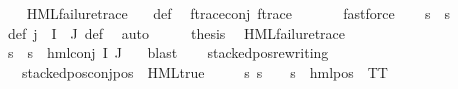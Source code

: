 \begin{isabellebody}
\ \ \isamarkupfalse%
\ {\isachardoublequoteopen}HML{\isacharunderscore}{\kern0pt}failure{\isacharunderscore}{\kern0pt}trace\ {\isasympsi}{\isachardoublequoteclose}\ \isamarkupfalse%
\ {\isasympsi}{\isacharunderscore}{\kern0pt}def\ \isamarkupfalse%
\ f{\isacharunderscore}{\kern0pt}trace{\isacharunderscore}{\kern0pt}conj\ f{\isacharunderscore}{\kern0pt}trace\ \isanewline
\ \ \ \ \isamarkupfalse%
\ fastforce\isanewline
\ \ \isamarkupfalse%
\ {\isachardoublequoteopen}{\isasymforall}s{\isachardot}{\kern0pt}\ {\isasymnot}\ s\ {\isasymTurnstile}\ {\isasympsi}{\isachardoublequoteclose}\ \isanewline
\ \ \ \ \isamarkupfalse%
\ {\isasymPsi}{\isacharunderscore}{\kern0pt}def\ {\isacartoucheopen}j\ {\isasymin}\ I\ {\isasyminter}\ J{\isacartoucheclose}\ {\isasympsi}{\isacharunderscore}{\kern0pt}def\ \isamarkupfalse%
\ auto\isanewline
\ \ \isamarkupfalse%
\ \isamarkupfalse%
\ {\isacharquery}{\kern0pt}thesis\ \isamarkupfalse%
\ {\isacartoucheopen}HML{\isacharunderscore}{\kern0pt}failure{\isacharunderscore}{\kern0pt}trace\ {\isasympsi}{\isacartoucheclose}\ \isanewline
\ \ \ \ \isamarkupfalse%
\ {\isacartoucheopen}{\isasymforall}s{\isachardot}{\kern0pt}\ {\isasymnot}\ s\ {\isasymTurnstile}\ hml{\isacharunderscore}{\kern0pt}conj\ I\ J\ {\isasymPhi}{\isacartoucheclose}\ \isamarkupfalse%
\ blast\isanewline
\ \ \isamarkupfalse%
\isanewline
{}\isamarkupfalse%
%
\endisatagproof
{\isafoldproof}%
%
\isadelimproof
\isanewline
%
\endisadelimproof
\isanewline
{}\isamarkupfalse%
\ stacked{\isacharunderscore}{\kern0pt}pos{\isacharunderscore}{\kern0pt}rewriting{\isacharcolon}{\kern0pt}\isanewline
\ \ \ {\isachardoublequoteopen}stacked{\isacharunderscore}{\kern0pt}pos{\isacharunderscore}{\kern0pt}conj{\isacharunderscore}{\kern0pt}pos\ {\isasymphi}{\isachardoublequoteclose}\ {\isachardoublequoteopen}{\isasymnot}HML{\isacharunderscore}{\kern0pt}true\ {\isasymphi}{\isachardoublequoteclose}\isanewline
\ \ \ {\isachardoublequoteopen}{\isasymexists}{\isasymalpha}{\isachardot}{\kern0pt}\ {\isacharparenleft}{\kern0pt}{\isasymforall}s{\isachardot}{\kern0pt}\ {\isacharparenleft}{\kern0pt}s\ {\isasymTurnstile}\ {\isasymphi}{\isacharparenright}{\kern0pt}\ {\isasymlongleftrightarrow}\ {\isacharparenleft}{\kern0pt}s\ {\isasymTurnstile}\ {\isacharparenleft}{\kern0pt}hml{\isacharunderscore}{\kern0pt}pos\ {\isasymalpha}\ TT{\isacharparenright}{\kern0pt}{\isacharparenright}{\kern0pt}{\isacharparenright}{\kern0pt}{\isachardoublequoteclose}\isanewline

\end{isabellebody}
